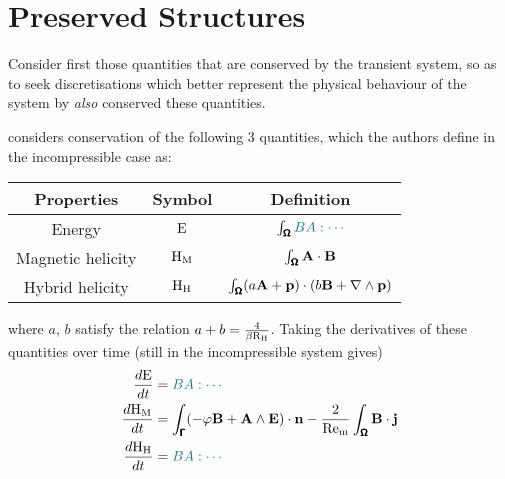 \section{Preserved Structures}
    Consider first those quantities that are conserved by the transient system, so as to seek discretisations which better represent the physical behaviour of the system by \emph{also} conserved these quantities. 
    
    \cite{LHF22} considers conservation of the following 3 quantities, which the authors define in the incompressible case as: 
    \begin{center}\begin{tabular}{ c c c }
        Properties  &  Symbol  &  Definition  \\
        \hline\hline
        Energy  &  $\mathrm{E}$  &  $\int_{\pmb{\mathsf{\Omega}}}\textcolor{teal}{BA: \cdots}$  \\
        Magnetic helicity  &  $\mathrm{H}_{\mathrm{M}}$  &  $\int_{\pmb{\mathsf{\Omega}}}\mathbf{A}\cdot\mathbf{B}$  \\
        Hybrid helicity  &  $\mathrm{H}_{\mathrm{H}}$  &  $\int_{\pmb{\mathsf{\Omega}}}(a\mathbf{A} + \mathbf{p})\cdot(b\mathbf{B} + \nabla\wedge\mathbf{p})$
    \end{tabular}\end{center}
    where $a$, $b$ satisfy the relation $a + b  =  \frac{4}{\beta\mathrm{R}_{\mathrm{H}}}$.  Taking the derivatives of these quantities over time (still in the incompressible system gives)
    \begin{align}
        \frac{d\mathrm{E}}{dt}  &=  \textcolor{teal}{BA: \cdots}  \\
        \frac{d\mathrm{H}_{\mathrm{M}}}{dt}  &=  \int_{\pmb{\mathsf{\Gamma}}}(- \varphi\mathbf{B} + \mathbf{A}\wedge\mathbf{E})\cdot\mathbf{n} - \frac{2}{\mathrm{Re}_{\mathrm{m}}}\int_{\pmb{\mathsf{\Omega}}}\mathbf{B}\cdot\mathbf{j}  \\
        \frac{d\mathrm{H}_{\mathrm{H}}}{dt}  &=  \textcolor{teal}{BA: \cdots} \\
    \end{align}
    
    